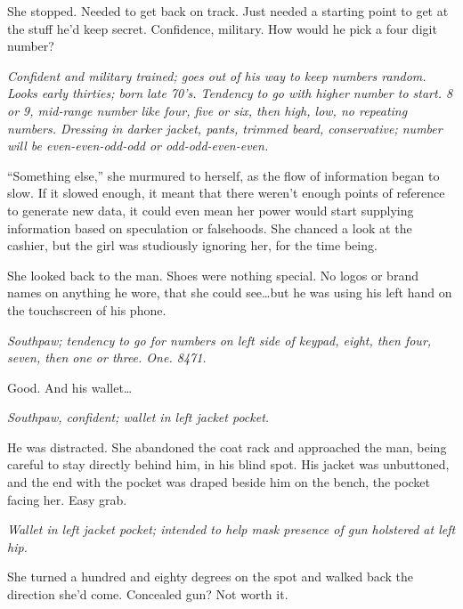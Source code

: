 She stopped.  Needed to get back on track.  Just needed a starting point to get at the stuff he'd keep secret.  Confidence, military.  How would he pick a four digit number?



\emph{Confident and military trained; goes out of his way to keep numbers random.  Looks early thirties; born late 70's.  Tendency to go with higher number to start.  8 or 9, mid-range number like four, five or six, then high, low, no repeating numbers.  Dressing in darker jacket, pants, trimmed beard, conservative; number will be even-even-odd-odd or odd-odd-even-even.}



``Something else,'' she murmured to herself, as the flow of information began to slow.  If it slowed enough, it meant that there weren't enough points of reference to generate new data, it could even mean her power would start supplying information based on speculation or falsehoods.  She chanced a look at the cashier, but the girl was studiously ignoring her, for the time being.



She looked back to the man.  Shoes were nothing special.  No logos or brand names on anything he wore, that she could see\ldots but he was using his left hand on the touchscreen of his phone.



\emph{Southpaw; tendency to go for numbers on left side of keypad, eight, then four, seven, then one or three.  One.  8471.}



Good.  And his wallet\ldots



\emph{Southpaw, confident; wallet in left jacket pocket.}



He was distracted.  She abandoned the coat rack and approached the man, being careful to stay directly behind him, in his blind spot.  His jacket was unbuttoned, and the end with the pocket was draped beside him on the bench, the pocket facing her.  Easy grab.



\emph{Wallet in left jacket pocket; intended to help mask presence of gun holstered at left hip.}



She turned a hundred and eighty degrees on the spot and walked back the direction she'd come.  Concealed gun?  Not worth it.



